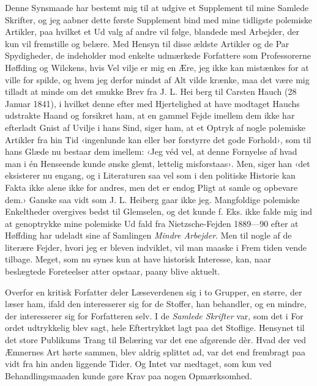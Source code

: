 \documentclass[12pt,a4paper,openany]{book}
\newcommand{\opage}[1]{\marginnote{\footnotesize\textit{[#1]}}}
\begin{document}
Denne Synsmaade har bestemt mig til at udgive et Supplement
til mine Samlede Skrifter, og jeg aabner dette første Supplement%
\opage{2}bind med mine tidligste polemiske Artikler, paa hvilket et Ud\-%
valg af andre vil følge, blandede med Arbejder, der kun vil
fremstille og belære. Med Hensyn til disse ældste Artikler og
de Par Spydigheder, de indeholder mod enkelte udmærkede
Forfattere som Professorerne Høffding og Wilckens, hvis Vel\-%
vilje er mig en Ære, jeg ikke kan mistænkes for at ville for\-%
spilde, og hvem jeg derfor mindst af Alt vilde krænke, maa det
være mig tilladt at minde om det smukke Brev fra J. L. Hei\-%
berg til Carsten Hauch (28 Januar 1841), i hvilket denne efter
med Hjertelighed at have modtaget Hauchs udstrakte Haand
og forsikret ham, at en gammel Fejde imellem dem ikke har
efterladt Gnist af Uvilje i hans Sind, siger ham, at et Optryk
af nogle polemiske Artikler fra hin Tid ‹ingenlunde kan eller
bør forstyrre det gode Forhold›, som til hans Glæde nu bestaar
dem imellem: ‹Jeg véd vel, at denne Fornyelse af hvad man i
én Henseende kunde ønske glemt, lettelig misforstaas›. Men,
siger han ‹det eksisterer nu engang, og i Literaturen saa vel
som i den politiske Historie kan Fakta ikke alene ikke for\-%
andres, men det er endog Pligt at samle og opbevare dem.›
Ganske saa vidt som J. L. Heiberg gaar ikke jeg. Mangfoldige
polemiske Enkeltheder overgives bedst til Glemselen, og det kunde
f. Eks. ikke falde mig ind at genoptrykke mine polemiske Ud\-%
fald fra Nietzsche-Fejden 1889---90 efter at Høffding har udeladt
sine af Samlingen \emph{Mindre Arbejder}. Men til nogle af de literære
Fejder, hvori jeg er bleven indviklet, vil man maaske i Frem\-%
tiden vende tilbage. Meget, som nu synes kun at have historisk
Interesse, kan, naar beslægtede Foreteelser atter opstaar, paany
blive aktuelt.

Overfor en kritisk Forfatter deler Læseverdenen sig i to
Grupper, en større, der læser ham, ifald den interesserer sig for
de Stoffer, han behandler, og en mindre, der interesserer sig
for Forfatteren selv. I de \emph{Samlede Skrifter} var, som det i For\-%
ordet udtrykkelig blev sagt, hele Eftertrykket lagt paa det Stoflige.
\opage{3}Hensynet til det store Publikums Trang til Belæring var det
ene afgørende dèr. Hvad der ved Æmnernes Art hørte sammen,
blev aldrig splittet ad, var det end frembragt paa vidt fra hin\-%
anden liggende Tider. Og Intet var medtaget, som kun ved
Behandlingsmaaden kunde gøre Krav paa nogen Opmærksomhed.
\end{document}
